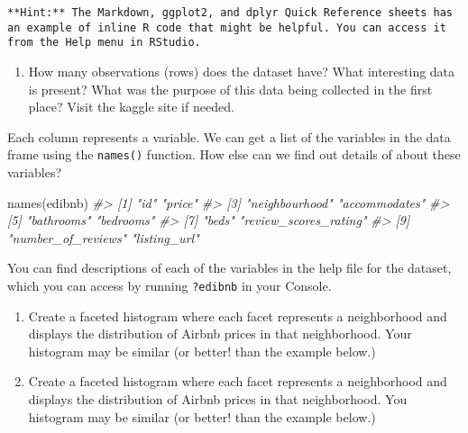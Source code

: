 \documentclass[
]{book}
\newenvironment{Shaded}{\begin{snugshade}}{\end{snugshade}}
\newcommand{\CommentTok}[1]{\textcolor[rgb]{0.56,0.35,0.01}{\textit{#1}}}
\newcommand{\FunctionTok}[1]{\textcolor[rgb]{0.00,0.00,0.00}{#1}}
\newcommand{\NormalTok}[1]{#1}
\providecommand{\tightlist}{%
  \setlength{\itemsep}{0pt}\setlength{\parskip}{0pt}}
\begin{document}
\begin{verbatim}
**Hint:** The Markdown, ggplot2, and dplyr Quick Reference sheets has an example of inline R code that might be helpful. You can access it from the Help menu in RStudio.
\end{verbatim}

\begin{enumerate}
\def\labelenumi{\arabic{enumi}.}
\setcounter{enumi}{2}
\tightlist
\item
  How many observations (rows) does the dataset have? What interesting data is present? What was the purpose of this data being collected in the first place? Visit the kaggle site if needed.
\end{enumerate}

Each column represents a variable. We can get a list of the variables in the data frame using the \texttt{names()} function. How else can we find out details of about these variables?

\begin{Shaded}
\begin{Highlighting}[]
\FunctionTok{names}\NormalTok{(edibnb)}
\CommentTok{\#\textgreater{}  [1] "id"                   "price"               }
\CommentTok{\#\textgreater{}  [3] "neighbourhood"        "accommodates"        }
\CommentTok{\#\textgreater{}  [5] "bathrooms"            "bedrooms"            }
\CommentTok{\#\textgreater{}  [7] "beds"                 "review\_scores\_rating"}
\CommentTok{\#\textgreater{}  [9] "number\_of\_reviews"    "listing\_url"}
\end{Highlighting}
\end{Shaded}

You can find descriptions of each of the variables in the help file for the dataset, which you can access by running \texttt{?edibnb} in your Console.

\begin{enumerate}
\def\labelenumi{\arabic{enumi}.}
\setcounter{enumi}{3}
\item
  Create a faceted histogram where each facet represents a neighborhood and displays the distribution of Airbnb prices in that neighborhood. Your histogram may be similar (or better! than the example below.)
\item
  Create a faceted histogram where each facet represents a neighborhood and displays the distribution of Airbnb prices in that neighborhood. You histogram may be similar (or better! than the example below.)
\end{enumerate}
\end{document}
